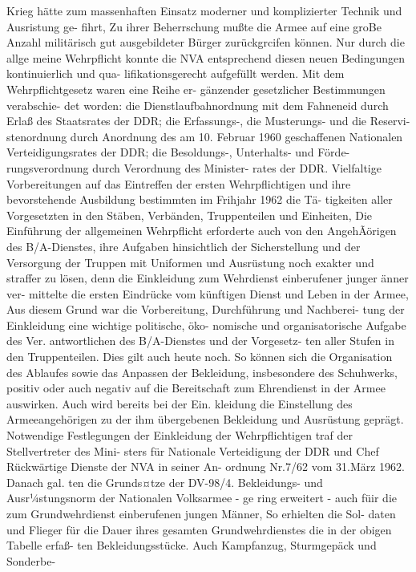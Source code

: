 Krieg hätte zum massenhaften Einsatz moderner
und komplizierter Technik und Ausristung ge-
fihrt, Zu ihrer Beherrschung mußte die Armee auf
eine groBe Anzahl militärisch gut ausgebildeter
Bürger zurückgrcifen können. Nur durch die allge
meine Wehrpflicht konnte die NVA entsprechend diesen neuen Bedingungen kontinuierlich und qua-
lifikationsgerecht aufgefüllt werden.
Mit dem Wehrpflichtgesetz waren eine Reihe er-
gänzender gesetzlicher Bestimmungen verabschie-
det worden: die Dienstlaufbahnordnung mit dem
Fahneneid durch Erlaß des Staatsrates der DDR;
die Erfassungs-, die Musterungs- und die Reservi-
stenordnung durch Anordnung des am 10. Februar
1960 geschaffenen Nationalen Verteidigungsrates
der DDR; die Besoldungs-, Unterhalts- und Förde-
rungsverordnung durch Verordnung des Minister-
rates der DDR.
Vielfaltige Vorbereitungen auf das Eintreffen der
ersten Wehrpflichtigen und ihre bevorstehende
Ausbildung bestimmten im Frihjahr 1962 die Tä-
tigkeiten aller Vorgesetzten in den Stäben, Verbänden, Truppenteilen und Einheiten, Die Einführung
der allgemeinen Wehrpflicht erforderte auch von
den AngehÃörigen des B/A-Dienstes, ihre Aufgaben
hinsichtlich der Sicherstellung und der Versorgung
der Truppen mit Uniformen und Ausrüstung noch
exakter und straffer zu lösen, denn die Einkleidung
zum Wehrdienst einberufener junger änner ver-
mittelte die ersten Eindrücke vom künftigen Dienst
und Leben in der Armee, Aus diesem Grund war
die Vorbereitung, Durchführung und Nachberei-
tung der Einkleidung eine wichtige politische, öko-
nomische und organisatorische Aufgabe des Ver.
antwortlichen des B/A-Dienstes und der Vorgesetz-
ten aller Stufen in den Truppenteilen. Dies gilt
auch heute noch. So können sich die Organisation
des Ablaufes sowie das Anpassen der Bekleidung,
insbesondere des Schuhwerks, positiv oder auch negativ auf die Bereitschaft zum Ehrendienst in der
Armee auswirken. Auch wird bereits bei der Ein.
kleidung die Einstellung des Armeeangehörigen zu
der ihm übergebenen Bekleidung und Ausrüstung
geprägt.
Notwendige Festlegungen der Einkleidung der
Wehrpflichtigen traf der Stellvertreter des Mini-
sters für Nationale Verteidigung der DDR und
Chef Rückwärtige Dienste der NVA in seiner An-
ordnung Nr.7/62 vom 31.März 1962. Danach gal.
ten die Grunds¤tze der DV-98/4. Bekleidungs- und
Ausr¼stungsnorm der Nationalen Volksarmee - ge
ring erweitert - auch füir die zum Grundwehrdienst
einberufenen jungen Männer, So erhielten die Sol-
daten und Flieger für die Dauer ihres gesamten Grundwehrdienstes die in der obigen Tabelle erfaß-
ten Bekleidungsstücke.
Auch Kampfanzug, Sturmgepäck und Sonderbe-
